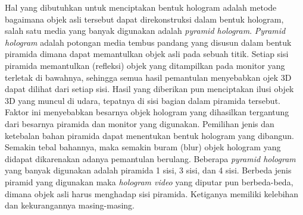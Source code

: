 	Hal yang dibutuhkan untuk menciptakan bentuk hologram adalah metode bagaimana objek asli tersebut dapat direkonstruksi dalam bentuk hologram, salah satu media yang banyak digunakan adalah \textit{pyramid hologram}. \textit{Pyramid hologram} adalah potongan media tembus pandang yang disusun dalam bentuk piramida dimana dapat memantulkan objek asli pada sebuah titik. Setiap sisi piramida memantulkan (refleksi) objek yang ditampilkan pada  monitor yang terletak di bawahnya, sehingga semua hasil pemantulan menyebabkan ojek 3D dapat dilihat dari setiap sisi. Hasil yang diberikan pun  menciptakan ilusi objek 3D yang muncul di udara, tepatnya di sisi bagian dalam piramida tersebut. Faktor ini menyebabkan besarnya objek hologram yang dihasilkan tergantung dari besarnya piramida dan monitor yang digunakan. Pemilihan jenis dan ketebalan bahan piramida dapat menentukan bentuk hologram yang dibangun. Semakin tebal bahannya, maka semakin buram (blur) objek hologram yang didapat dikarenakan adanya pemantulan berulang\cite{hologrampyramid}. Beberapa \textit{pyramid hologram} yang banyak digunakan adalah piramida 1 sisi, 3 sisi, dan 4 sisi. Berbeda jenis piramid yang digunakan maka \textit{hologram video} yang diputar pun berbeda-beda, dimana objek asli harus menghadap sisi piramida\cite{mahfud2016interactive}. Ketiganya memiliki kelebihan dan kekurangannya masing-masing.
	
